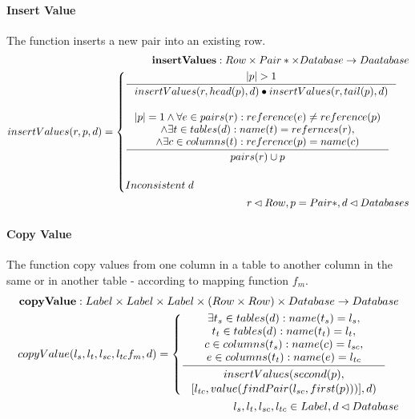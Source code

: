 \documentclass[11pt]{article}
\begin{document}
\paragraph{Insert Value} The function inserts a new pair into an existing row.
\begin{align*}
	\mathbf{insertValues} : Row \times Pair* \times Database \rightarrow Daatabase \\
	insertValues(r, p, d) = \begin{cases}
 		\inference{|p| > 1}{insertValues(r, head(p), d)\bullet insertValues(r, tail(p), d)}  \\ \\
 		\inference{|p| = 1 \wedge \forall e \in pairs(r) : reference(e) \neq reference(p) \\ \wedge \exists t \in tables(d) : name(t) = refernces(r), \\ \wedge \exists c \in columns(t) : reference(p) = name(c)}{pairs(r) \cup p} \\ \\
	 	 Inconsistent \; d
 		\end{cases} \\
r \lhd Row, p = Pair*,d \lhd Databases
\end{align*}
\paragraph{Copy Value} The function copy values from one column in a table to another column in the same or in another table - according to mapping function $f_m$. 
\begin{align*}
	\mathbf{copyValue} : Label \times Label \times Label \times (Row \times Row) \times Database \rightarrow Database \\
	copyValue(l_s, l_t, l_{sc}, l_{tc} f_m, d) = \begin{cases}
		\inference{\exists t_s \in tables(d) : name(t_s) = l_s, \\ t_t \in tables(d) : name(t_t) = l_t, \\ c \in columns(t_s) : name(c) = l_{sc}, \\ e \in columns(t_t) : name(e) = l_{tc}}{\begin{gathered}
			insertValues(second(p), \\ [l_{tc},value(findPair(l_{sc}, first(p)))],d)
		\end{gathered}}
 	\end{cases} \\
 	l_s, l_t, l_{sc}, l_{tc} \in Label, d \lhd Database
\end{align*}
\end{document}
